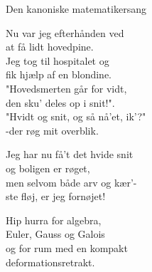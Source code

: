 \begin{song}{Den kanoniske matematikersang}
  \begin{SBVerse}
	Nu var jeg efterhånden ved\\
	at få lidt hovedpine.\\
	Jeg tog til hospitalet og\\
	fik hjælp af en blondine.\\\medskip
	"Hovedsmerten går for vidt,\\
	den sku' deles op i snit!".\\
	"Hvidt og snit, og så nå'et, ik'?"\\
	-der røg mit overblik.
  \end{SBVerse}

  \begin{SBVerse}
	Jeg har nu få't det hvide snit\\
	og boligen er røget,\\
	men selvom både arv og kær'-\\
	ste fløj, er jeg fornøjet!
  \end{SBVerse}

  \begin{SBChorus}
	Hip hurra for algebra,\\
	Euler, Gauss og Galois\\
	og for rum med en kompakt\\
	deformationsretrakt.
  \end{SBChorus}
\end{song}




